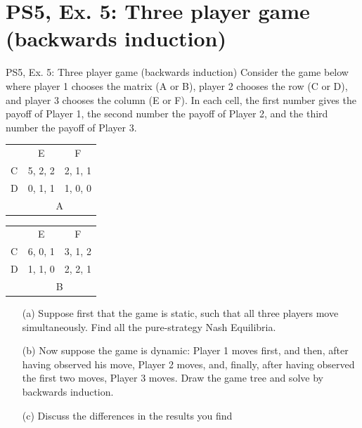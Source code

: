 \section{PS5, Ex. 5: Three player game (backwards induction)}

\begin{frame}{PS5, Ex. 5: Three player game (backwards induction)}
    Consider the game below where player 1 chooses the matrix (A or B), player 2 chooses the row (C or D), and player 3 chooses the column (E or F). In each cell, the first number gives the payoff of Player 1, the second number the payoff of Player 2, and the third number the payoff of Player 3.
    \begin{table}
      \begin{tabular}{l|c|c|}
        \multicolumn{1}{c}{} & \multicolumn{1}{c}{E} & \multicolumn{1}{c}{F} \\\cline{2-3}
        C & 5, 2, 2 & 2, 1, 1 \\\cline{2-3}
        D & 0, 1, 1 & 1, 0, 0 \\\cline{2-3}
        \multicolumn{1}{c}{} & \multicolumn{2}{c}{A}
      \end{tabular}\quad
      \begin{tabular}{l|c|c|}
        \multicolumn{1}{c}{} & \multicolumn{1}{c}{E} & \multicolumn{1}{c}{F} \\\cline{2-3}
        C & 6, 0, 1 & 3, 1, 2 \\\cline{2-3}
        D & 1, 1, 0 & 2, 2, 1 \\\cline{2-3}
        \multicolumn{1}{c}{} & \multicolumn{2}{c}{B}
      \end{tabular}
    \end{table}
    \begin{itemize}
      \item[(a)] Suppose first that the game is static, such that all three players move simultaneously. Find all the pure-strategy Nash Equilibria.
      \item[(b)] Now suppose the game is dynamic: Player 1 moves first, and then, after having observed his move, Player 2 moves, and, finally, after having observed the first two moves, Player 3 moves. Draw the game tree and solve by backwards induction.
      \item[(c)] Discuss the differences in the results you find
    \end{itemize}
  \vfill\null
\end{frame}

